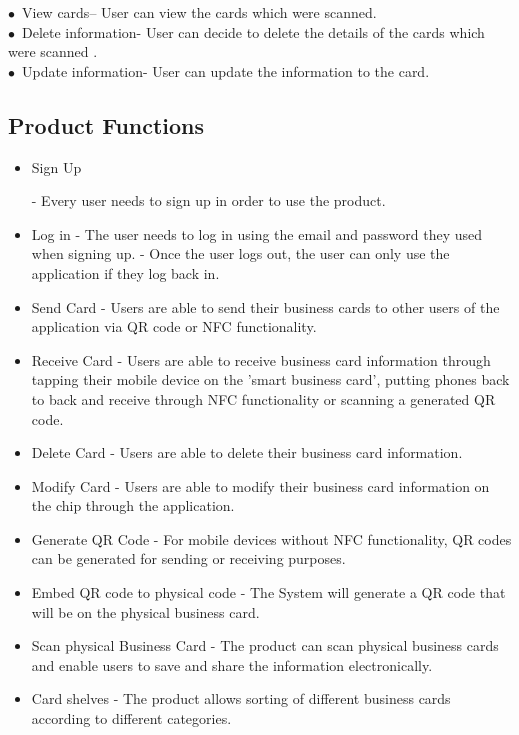 \documentclass[english]{article}
\begin{document}
$\bullet$\ View cards– User can view the cards which were scanned.
\\$\bullet$\ Delete information- User can decide to delete the details of the cards which were scanned .
\\$\bullet$\ Update information- User can update the information to the card.


					
		








				\subsection{Product Functions}
				\begin{itemize} 
					\item Sign Up
					
					\subitem
					- Every user needs to sign up in order to use the product.
					\item
					Log in
					\subitem
					- The user needs to log in using the email and password they used when signing up.
					\subitem 
					- Once the user logs out, the user can only use the application if they log back in.
					\item 
					Send Card
					\subitem
					- Users are able to send their business cards to other users of the application via QR code or NFC functionality.
					\item
					Receive Card
					\subitem
					- Users are able to receive business card information through tapping their mobile device on the 'smart business card', putting phones back to back and receive through NFC functionality or scanning a generated QR code.
					\item 
					Delete Card
					\subitem
					- Users are able to delete their business card information.
					\item
					Modify Card
					\subitem
					- Users are able to modify their business card information on the chip through the application.
					\item
					Generate QR Code
					\subitem
					- For mobile devices without NFC functionality, QR codes can be generated for sending or receiving purposes.
					\item
					Embed QR code to physical code
					\subitem
					- The System will generate a QR code that will be on the physical business card.
					\item
					Scan physical Business Card
					\subitem
					- The product can scan physical business cards and enable users to save and share the information electronically.
					\item
					Card shelves
					\subitem
					- The product allows sorting of different business cards according to different categories.
					

\end{itemize}
\end{document}
